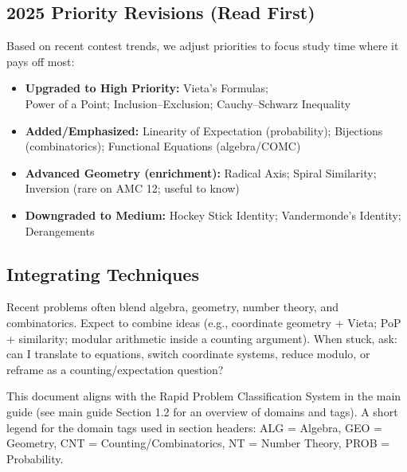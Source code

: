 \documentclass[12pt]{article}
\begin{document}
\subsection*{2025 Priority Revisions (Read First)}
Based on recent contest trends, we adjust priorities to focus study time where it pays off most:
\begin{itemize}
    \item \textbf{Upgraded to High Priority:} Vieta's Formulas; \\
    Power of a Point; Inclusion–Exclusion; Cauchy–Schwarz Inequality
    \item \textbf{Added/Emphasized:} Linearity of Expectation (probability); Bijections (combinatorics); Functional Equations (algebra/COMC)
    \item \textbf{Advanced Geometry (enrichment):} Radical Axis; Spiral Similarity; Inversion (rare on AMC 12; useful to know)
    \item \textbf{Downgraded to Medium:} Hockey Stick Identity; Vandermonde's Identity; Derangements
\end{itemize}

\subsection*{Integrating Techniques}
Recent problems often blend algebra, geometry, number theory, and combinatorics. Expect to combine ideas (e.g., coordinate geometry + Vieta; PoP + similarity; modular arithmetic inside a counting argument). When stuck, ask: can I translate to equations, switch coordinate systems, reduce modulo, or reframe as a counting/expectation question?

This document aligns with the Rapid Problem Classification System in the main guide (see main guide Section 1.2 for an overview of domains and tags). A short legend for the domain tags used in section headers: ALG = Algebra, GEO = Geometry, CNT = Counting/Combinatorics, NT = Number Theory, PROB = Probability.
\end{document}
